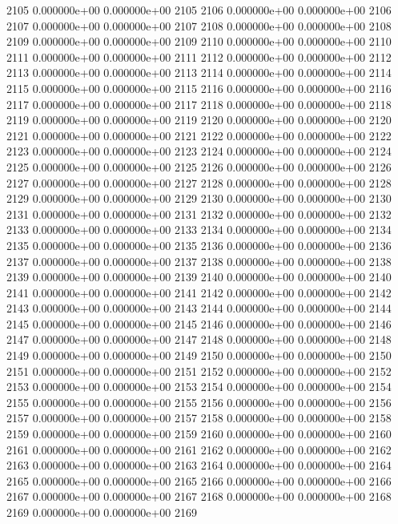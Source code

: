 \documentclass{article}
\begin{document}
\begin{Schunk}
\begin{Soutput}
2105   0.000000e+00   0.000000e+00 2105
2106   0.000000e+00   0.000000e+00 2106
2107   0.000000e+00   0.000000e+00 2107
2108   0.000000e+00   0.000000e+00 2108
2109   0.000000e+00   0.000000e+00 2109
2110   0.000000e+00   0.000000e+00 2110
2111   0.000000e+00   0.000000e+00 2111
2112   0.000000e+00   0.000000e+00 2112
2113   0.000000e+00   0.000000e+00 2113
2114   0.000000e+00   0.000000e+00 2114
2115   0.000000e+00   0.000000e+00 2115
2116   0.000000e+00   0.000000e+00 2116
2117   0.000000e+00   0.000000e+00 2117
2118   0.000000e+00   0.000000e+00 2118
2119   0.000000e+00   0.000000e+00 2119
2120   0.000000e+00   0.000000e+00 2120
2121   0.000000e+00   0.000000e+00 2121
2122   0.000000e+00   0.000000e+00 2122
2123   0.000000e+00   0.000000e+00 2123
2124   0.000000e+00   0.000000e+00 2124
2125   0.000000e+00   0.000000e+00 2125
2126   0.000000e+00   0.000000e+00 2126
2127   0.000000e+00   0.000000e+00 2127
2128   0.000000e+00   0.000000e+00 2128
2129   0.000000e+00   0.000000e+00 2129
2130   0.000000e+00   0.000000e+00 2130
2131   0.000000e+00   0.000000e+00 2131
2132   0.000000e+00   0.000000e+00 2132
2133   0.000000e+00   0.000000e+00 2133
2134   0.000000e+00   0.000000e+00 2134
2135   0.000000e+00   0.000000e+00 2135
2136   0.000000e+00   0.000000e+00 2136
2137   0.000000e+00   0.000000e+00 2137
2138   0.000000e+00   0.000000e+00 2138
2139   0.000000e+00   0.000000e+00 2139
2140   0.000000e+00   0.000000e+00 2140
2141   0.000000e+00   0.000000e+00 2141
2142   0.000000e+00   0.000000e+00 2142
2143   0.000000e+00   0.000000e+00 2143
2144   0.000000e+00   0.000000e+00 2144
2145   0.000000e+00   0.000000e+00 2145
2146   0.000000e+00   0.000000e+00 2146
2147   0.000000e+00   0.000000e+00 2147
2148   0.000000e+00   0.000000e+00 2148
2149   0.000000e+00   0.000000e+00 2149
2150   0.000000e+00   0.000000e+00 2150
2151   0.000000e+00   0.000000e+00 2151
2152   0.000000e+00   0.000000e+00 2152
2153   0.000000e+00   0.000000e+00 2153
2154   0.000000e+00   0.000000e+00 2154
2155   0.000000e+00   0.000000e+00 2155
2156   0.000000e+00   0.000000e+00 2156
2157   0.000000e+00   0.000000e+00 2157
2158   0.000000e+00   0.000000e+00 2158
2159   0.000000e+00   0.000000e+00 2159
2160   0.000000e+00   0.000000e+00 2160
2161   0.000000e+00   0.000000e+00 2161
2162   0.000000e+00   0.000000e+00 2162
2163   0.000000e+00   0.000000e+00 2163
2164   0.000000e+00   0.000000e+00 2164
2165   0.000000e+00   0.000000e+00 2165
2166   0.000000e+00   0.000000e+00 2166
2167   0.000000e+00   0.000000e+00 2167
2168   0.000000e+00   0.000000e+00 2168
2169   0.000000e+00   0.000000e+00 2169

\end{Soutput}
\end{Schunk}
\end{document}
